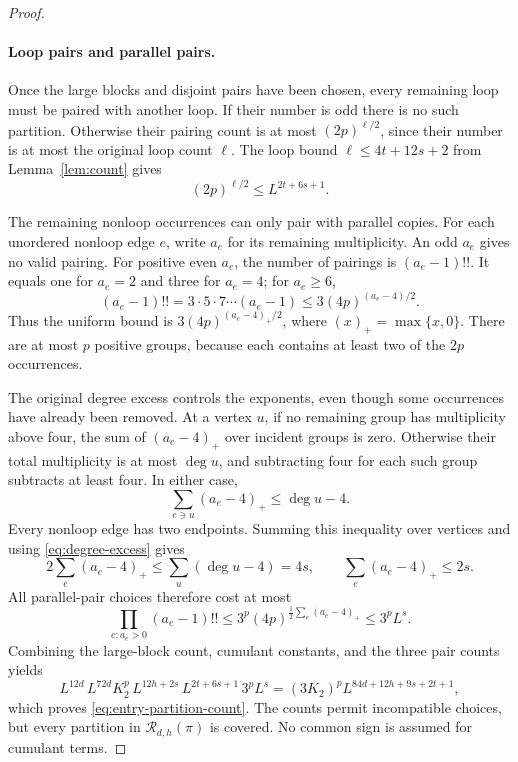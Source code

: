 \documentclass[11pt]{article}
\theoremstyle{definition}
\theoremstyle{remark}
\theoremstyle{plain}
\begin{document}
\begin{proof}
\paragraph{Loop pairs and parallel pairs.}
Once the large blocks and disjoint pairs have been chosen, every
remaining loop must be paired with another loop. If their number
is odd there is no such partition. Otherwise their pairing count
is at most $(2p)^{\ell/2}$, since their number is at most the
original loop count $\ell$. The loop bound
$\ell\le4t+12s+2$ from Lemma~\ref{lem:count} gives
\begin{equation}\label{eq:loop-pair-count}
                  (2p)^{\ell/2}\le L^{2t+6s+1}.
\end{equation}

The remaining nonloop occurrences can only pair with parallel
copies. For each unordered nonloop edge $e$, write $a_e$ for its
remaining multiplicity. An odd $a_e$ gives no valid pairing.
For positive even $a_e$, the number of pairings is $(a_e-1)!!$.
It equals one for $a_e=2$ and three for $a_e=4$; for $a_e\ge6$,
\[
 (a_e-1)!!=3\cdot5\cdot7\cdots(a_e-1)
       \le3(4p)^{(a_e-4)/2}.
\]
Thus the uniform bound is $3(4p)^{(a_e-4)_+/2}$, where
$(x)_+=\max\{x,0\}$. There are at most $p$ positive groups,
because each contains at least two of the $2p$ occurrences.

The original degree excess controls the exponents, even
though some occurrences have already been removed. At a vertex
$u$, if no remaining group has multiplicity above four, the sum
of $(a_e-4)_+$ over incident groups is zero. Otherwise their total
multiplicity is at most $\deg u$, and subtracting four for each
such group subtracts at least four. In either case,
\[
 \sum_{e\ni u}(a_e-4)_+\le\deg u-4.
\]
Every nonloop edge has two endpoints. Summing this inequality over
vertices and using \eqref{eq:degree-excess} gives
\[
 2\sum_e(a_e-4)_+\le\sum_u(\deg u-4)=4s,
 \qquad \sum_e(a_e-4)_+\le2s.
\]
All parallel-pair choices therefore cost at most
\[
 \prod_{e:a_e>0}(a_e-1)!!
       \le3^p(4p)^{\frac12\sum_e(a_e-4)_+}\le3^pL^s.
\]
Combining the large-block count, cumulant constants, and the three
pair counts yields
\[
 L^{12d}\,L^{72d}K_2^p\,L^{12h+2s}\,
 L^{2t+6s+1}\,3^pL^s
       =(3K_2)^pL^{84d+12h+9s+2t+1},
\]
which proves \eqref{eq:entry-partition-count}. The counts permit
incompatible choices, but every partition in
$\mathcal R_{d,h}(\pi)$ is covered. No common sign is assumed
for cumulant terms.


\end{proof}
\end{document}
